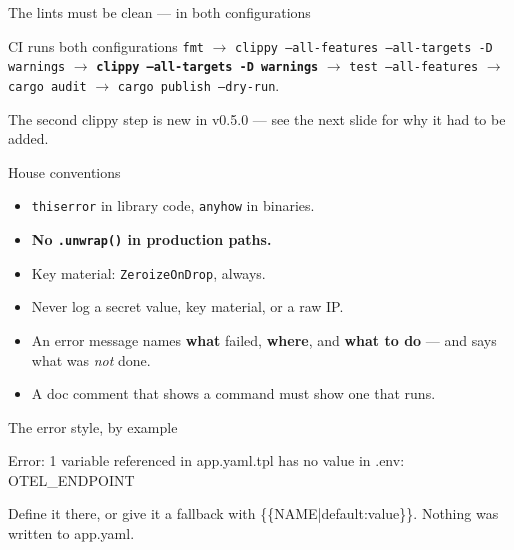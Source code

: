 \documentclass[aspectratio=169,10pt]{beamer}
\begin{document}
\begin{frame}[fragile]{The lints must be clean --- in both configurations}

  \begin{block}{CI runs both configurations}
    \texttt{fmt} $\rightarrow$
    \texttt{clippy --all-features --all-targets -D warnings} $\rightarrow$
    \textbf{\texttt{clippy --all-targets -D warnings}} $\rightarrow$
    \texttt{test --all-features} $\rightarrow$ \texttt{cargo audit} $\rightarrow$
    \texttt{cargo publish --dry-run}.

    \vspace{0.3em}
    {\footnotesize The second clippy step is new in v0.5.0 --- see the next
    slide for why it had to be added.}
  \end{block}
\end{frame}

\begin{frame}[fragile]{House conventions}
  \begin{itemize}
    \item \texttt{thiserror} in library code, \texttt{anyhow} in binaries.
    \item \textbf{No \texttt{.unwrap()} in production paths.}
    \item Key material: \texttt{ZeroizeOnDrop}, always.
    \item Never log a secret value, key material, or a raw IP.
    \item An error message names \textbf{what} failed, \textbf{where}, and
          \textbf{what to do} --- and says what was \emph{not} done.
    \item A doc comment that shows a command must show one that runs.
  \end{itemize}

  \vspace{0.7em}
  \begin{block}{The error style, by example}
\begin{semiverbatim}\scriptsize
Error: 1 variable referenced in app.yaml.tpl has no value in .env: OTEL_ENDPOINT

Define it there, or give it a fallback with \{\{NAME|default:value\}\}.
Nothing was written to app.yaml.
\end{semiverbatim}
  \end{block}
\end{frame}
\end{document}
